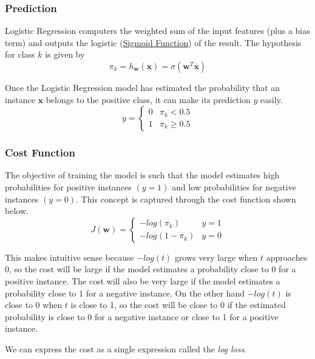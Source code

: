 \documentclass[12pt]{article}
\begin{document}
        \subsubsection{Prediction}
            Logistic Regression computers the weighted sum of the input features (plus a bias term) and outputs the logistic (\hyperlink{sigmoid function}{Sigmoid Function}) of the result. The hypothesis for class $k$ is given by
            $$ \pi_k = h_{\boldsymbol{w}}(\boldsymbol{x}) = \sigma(\boldsymbol{w}^T\overline{\boldsymbol{x}}) $$
            
            Once the Logistic Regression model has estimated the probability that an instance $\boldsymbol{x}$ belongs to the positive class, it can make its prediction $y$ easily.
            \[ y = 
                \begin{cases} 
                    0 & \pi_k < 0.5 \\
                    1 & \pi_k \geq 0.5 
                \end{cases}
            \]
        
        \subsubsection{Cost Function}
            The objective of training the model is such that the model estimates high probabilities for positive instances $(y = 1)$ and low probabilities for negative instances $(y = 0)$.
            This concept is captured through the cost function shown below.
            \[ J(\boldsymbol{w}) = 
                \begin{cases}
                    -log(\pi_k) & y = 1 \\
                    -log(1-\pi_k) & y = 0
                \end{cases}
            \]
            
            This makes intuitive sense because $-log(t)$ grows very large when $t$ approaches 0, so the cost will be large if the model estimates a probability close to 0 for a positive instance.
            The cost will also be very large if the model estimates a probability close to 1 for a negative instance. On the other hand $-log(t)$ is close to 0 when $t$ is close to 1, so the cost
            will be close to 0 if the estimated probability is close to 0 for a negative instance or close to 1 for a positive instance.

            We can express the cost as a single expression called the \textit{log loss}. 
\end{document}

